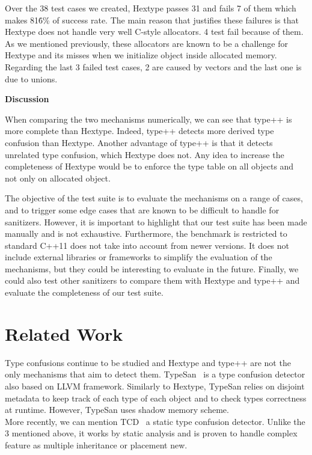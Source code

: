 \documentclass[a4paper,11pt,oneside]{report}
\begin{document}
\noindent{}Over the 38 test cases we created, Hextype passes 31 and 
fails 7 of them which makes 81\.6\% of success rate.
The main reason that justifies these failures is that Hextype does not handle very well
C-style allocators. 4 test fail because of them. As we mentioned previously, these allocators
are known to be a challenge for Hextype and its misses when we initialize object inside allocated memory. 
Regarding the last 3 failed test cases, 2 are caused by vectors and the last one is due to unions. 

\textbf{Discussion}

\noindent{}When comparing the two mechanisms numerically, we can see that type++ is more complete than Hextype.
Indeed, type++ detects more derived type confusion than Hextype. Another advantage of type++ is that it
detects unrelated type confusion, which Hextype does not. Any idea to increase the completeness of Hextype would be 
to enforce the type table on all objects and not only on allocated object.  

The objective of the test suite is to evaluate the mechanisms on a range of cases, and to trigger 
some edge cases that are known to be difficult to handle for sanitizers. However, it is important to highlight 
that our test suite has been made manually and is not exhaustive. Furthermore, the benchmark is restricted to
standard C++11 does not take into account from newer versions. It does not include external libraries or frameworks
to simplify the evaluation of the mechanisms, but they could be interesting to evaluate in the future. Finally,
we could also test other sanitizers to compare them with Hextype and type++ and evaluate the completeness of 
our test suite.


\chapter{Related Work}

Type confusions continue to be studied and 
Hextype and type++ are not the only mechanisms that aim to detect them.
TypeSan~\cite{typesan} is a type confusion detector also based on LLVM framework.
Similarly to Hextype, TypeSan relies on disjoint metadata to keep track of each 
type of each object and to check types correctness at runtime. However, TypeSan uses
shadow memory scheme.\\
More recently, we can mention TCD~\cite{tcd} a static type confusion detector. 
Unlike the 3 mentioned above, it works by static analysis and is proven to 
handle complex feature as multiple inheritance or placement new. 
\end{document}
